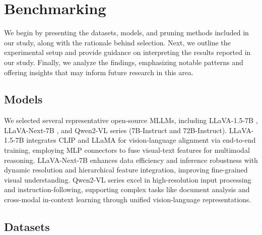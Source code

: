 \section{Benchmarking}



We begin by presenting the datasets, models, and pruning methods included in our study, along with the rationale behind selection.
Next, we outline the experimental setup and provide guidance on interpreting the results reported in our study. Finally, we analyze the findings, emphasizing notable patterns and offering insights that may inform future research in this area.


\subsection{Models}
We selected several representative open-source MLLMs, including LLaVA-1.5-7B \cite{liu2024improved}, LLaVA-Next-7B \citep{liu2024llavanext}, and Qwen2-VL \citep{wang2024qwen2} series (7B-Instruct and 72B-Instruct).
LLaVA-1.5-7B integrates CLIP and LLaMA for vision-language alignment via end-to-end training,
employing MLP connectors to fuse visual-text features for multimodal reasoning.
LLaVA-Next-7B enhances data efficiency and inference robustness with dynamic resolution and hierarchical feature integration,
improving fine-grained visual understanding.
Qwen2-VL series  excel in high-resolution input processing and instruction-following,
supporting complex tasks like document analysis and cross-modal in-context learning through unified vision-language representations.


\subsection{Datasets}

